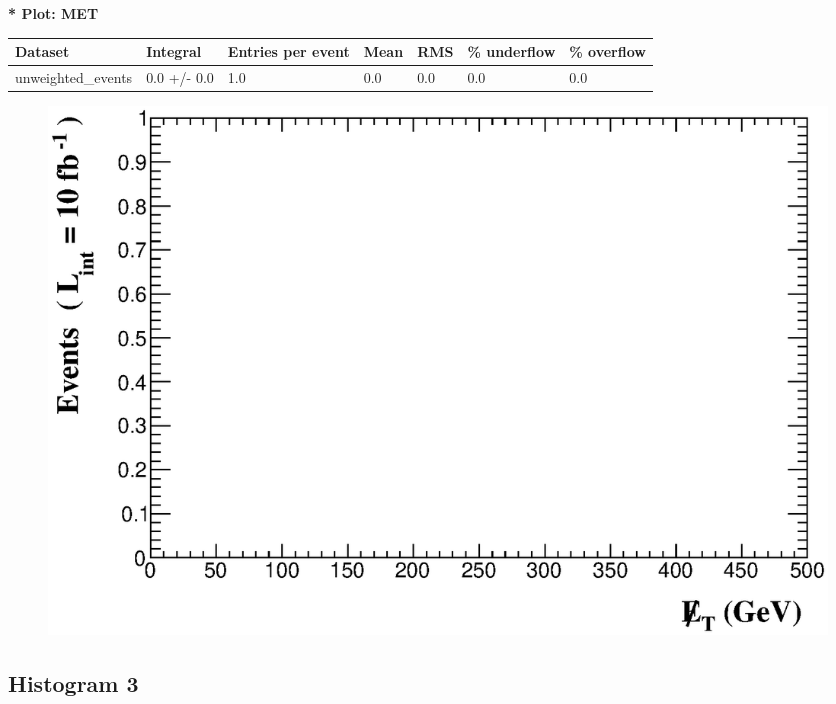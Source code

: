\documentclass[a4paper, 10pt]{article}
\begin{document}
\textbf{* Plot: MET}\\
   \begin{table}[H]
  \begin{center}
    \begin{tabular}{|m{23.0mm}|m{23.0mm}|m{18.0mm}|m{19.0mm}|m{19.0mm}|m{19.0mm}|m{19.0mm}|}
      \hline
      {\cellcolor{yellow}         Dataset}& {\cellcolor{yellow}         Integral}& {\cellcolor{yellow}         Entries per event}& {\cellcolor{yellow}         Mean}& {\cellcolor{yellow}         RMS}& {\cellcolor{yellow}         \% underflow}& {\cellcolor{yellow}         \% overflow}\\
      \hline
      {\cellcolor{white}         unweighted\_events}& {\cellcolor{white}         0.0 +/\-- 0.0}& {\cellcolor{white}         1.0}& {\cellcolor{white}         0.0}& {\cellcolor{white}         0.0}& {\cellcolor{green}         0.0}& {\cellcolor{green}         0.0}\\
\hline
    \end{tabular}
  \end{center}
\end{table}

\begin{figure}[H]
  \begin{center}
    \includegraphics[scale=0.45]{selection_1.eps}\\
\caption{   }
  \end{center}
\end{figure}
      \newpage
\subsection{ Histogram 3}
\end{document}
